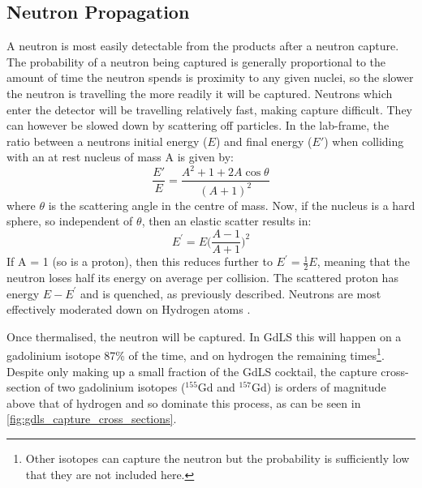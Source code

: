 

\subsection{Neutron Propagation}
\par
A neutron is most easily detectable from the products after a neutron capture.
The probability of a neutron being captured is generally proportional to the amount of time the neutron spends is proximity to any given nuclei, so the slower the neutron is travelling the more readily it will be captured.
Neutrons which enter the detector will be travelling relatively fast, making capture difficult.
They can however be slowed down by scattering off particles.
In the lab-frame, the ratio between a neutrons initial energy ($E$) and final energy ($E'$) when colliding with an at rest nucleus of mass A is given by:
\begin{equation}
    \frac{E'}{E} = \frac{A^2 + 1 + 2A\cos{\theta}}{(A + 1)^2}
\end{equation}
where $\theta$ is the scattering angle in the centre of mass.
Now, if the nucleus is a hard sphere, so independent of $\theta$, then an elastic scatter results in:
\begin{equation}
    E^{'} = E\bigg(\frac{A-1}{A+1}\bigg)^{2}
\end{equation}
If A = 1 (so is a proton), then this reduces further to $E^{'} = \frac{1}{2}E$, meaning that the neutron loses half its energy on average per collision.
The scattered proton has energy $E - E^{'}$ and is quenched, as previously described.
Neutrons are most effectively moderated down on Hydrogen atoms \cite{neutron_thermalisation_and_capture_ref}.

\par
Once thermalised, the neutron will be captured.
In GdLS this will happen on a gadolinium isotope 87\% of the time, and on hydrogen the remaining times\footnote{Other isotopes can capture the neutron but the probability is sufficiently low that they are not included here.}.
Despite only making up a small fraction of the GdLS cocktail, the capture cross-section of two gadolinium isotopes (${}^{155}$Gd and ${}^{157}$Gd) is orders of magnitude above that of hydrogen and so dominate this process, as can be seen in \autoref{fig:gdls_capture_cross_sections}.



